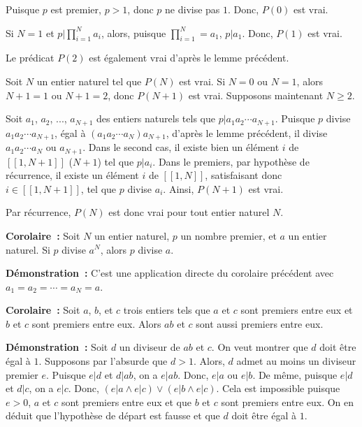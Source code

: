 Puisque $p$ est premier, $p > 1$, donc $p$ ne divise pas $1$. 
Donc, $P(0)$ est vrai.

Si $N = 1$ et $p \vert \prod_{i = 1}^N a_i$, alors, puisque $ \prod_{i = 1}^N= a_1$, $p \vert a_1$.
Donc, $P(1)$ est vrai.

Le prédicat $P(2)$ est également vrai d'après le lemme précédent. 

Soit $N$ un entier naturel tel que $P(N)$ est vrai. 
Si $N = 0$ ou $N = 1$, alors $N+1 = 1$ ou $N+1 = 2$, donc $P(N+1)$ est vrai.
Supposons maintenant $N \geq 2$.

Soit $a_1$, $a_2$, ..., $a_{N+1}$ des entiers naturels tels que $p \vert a_1 a_2 \cdots a_{N+1}$.
Puisque $p$ divise $a_1 a_2 \cdots a_{N+1}$, égal à $(a_1 a_2 \cdots a_N) a_{N+1}$, d'après le lemme précédent, il divise $a_1 a_2 \cdots a_N$ ou $a_{N+1}$. 
Dans le second cas, il existe bien un élément $i$ de $[\![1, N+1]\!]$ ($N+1$) tel que $p \vert a_i$. 
Dans le premiers, par hypothèse de récurrence, il existe un élément $i$ de $[\![1,N]\!]$, satisfaisant donc $i \in [\![1,N+1]\!]$, tel que $p$ divise $a_i$. 
Ainsi, $P(N+1)$ est vrai.

Par récurrence, $P(N)$ est donc vrai pour tout entier naturel $N$. 

\done

\medskip

\noindent\textbf{Corolaire :} 
Soit $N$ un entier naturel, $p$ un nombre premier, et $a$ un entier naturel.
Si $p$ divise $a^N$, alors $p$ divise $a$.

\medskip

\noindent\textbf{Démonstration :} 
C'est une application directe du corolaire précédent avec $a_1 = a_2 = \cdots = a_N = a$.

\done

\medskip

\noindent\textbf{Corolaire :} Soit $a$, $b$, et $c$ trois entiers tels que $a$ et $c$ sont premiers entre eux et $b$ et $c$ sont premiers entre eux. Alors $ab$ et $c$ sont aussi premiers entre eux.

\medskip 

\noindent\textbf{Démonstration :} Soit $d$ un diviseur de $ab$ et $c$. 
On veut montrer que $d$ doit être égal à $1$. 
Supposons par l'absurde que $d > 1$. 
Alors, $d$ admet au moins un diviseur premier $e$.
Puisque $e \vert d$ et $d \vert ab$, on a $e \vert ab$.
Donc, $e \vert a$ ou $e \vert b$.
De même, puisque $e \vert d$ et $d \vert c$, on a $e \vert c$.
Donc, $(e \vert a \wedge e \vert c) \vee (e \vert b \wedge e \vert c)$.
Cela est impossible puisque $e > 0$, $a$ et $c$ sont premiers entre eux et que $b$ et $c$ sont premiers entre eux. 
On en déduit que l'hypothèse de départ est fausse et que $d$ doit être égal à $1$. 

